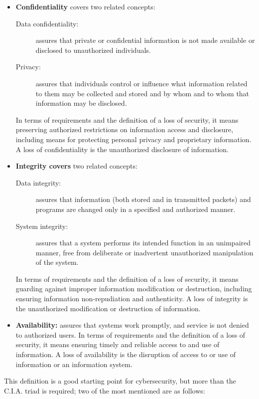 \begin{itemize}
	\item \textbf{Confidentiality} covers two related concepts:
	      \begin{description}
		      \item [Data confidentiality:] assures that private or confidential information is not made available or disclosed to unauthorized individuals.
		      \item [Privacy:] assures that individuals control or influence what information related to them may be collected and stored and by whom and to whom that information may be disclosed.
	      \end{description}
	      In terms of requirements and the definition of a loss of security, it means preserving authorized restrictions on information access and disclosure, including means for protecting personal privacy and proprietary information. A loss of confidentiality is the unauthorized disclosure of information.

	\item \textbf{Integrity covers} two related concepts:
	      \begin{description}
		      \item [Data integrity:] assures that information (both stored and in transmitted packets) and programs are changed only in a specified and authorized manner.
		      \item [System integrity:] assures that a system performs its intended function in an unimpaired manner, free from deliberate or inadvertent unauthorized manipulation of the system.
	      \end{description}
	      In terms of requirements and the definition of a loss of security, it means guarding against improper information modification or destruction, including ensuring information non-repudiation and authenticity. A loss of integrity is the unauthorized modification or destruction of information.

	\item \textbf{Availability:} assures that systems work promptly, and service is not denied to authorized users. In terms of requirements and the definition of a loss of security, it means ensuring timely and reliable access to and use of information. A loss of availability is the disruption of access to or use of information or an information system.
\end{itemize}

This definition is a good starting point for cybersecurity, but more than the C.I.A. triad is required; two of the most mentioned are as follows:

